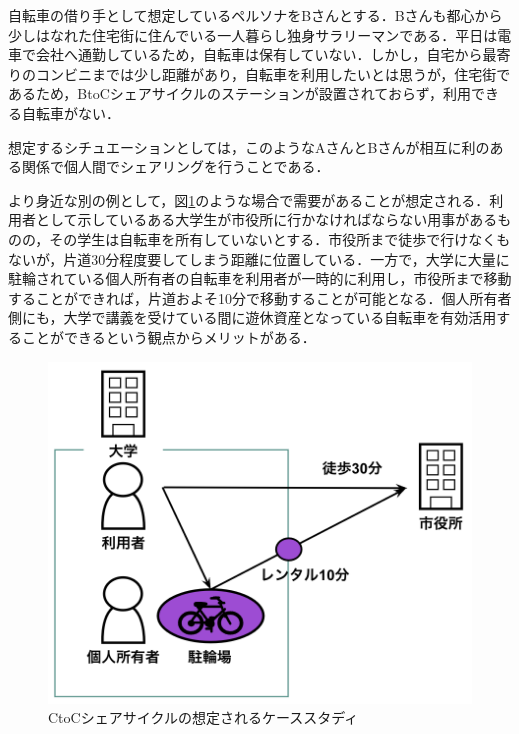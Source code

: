       \par 自転車の借り手として想定しているペルソナをBさんとする．Bさんも都心から少しはなれた住宅街に住んでいる一人暮らし独身サラリーマンである．平日は電車で会社へ通勤しているため，自転車は保有していない．しかし，自宅から最寄りのコンビニまでは少し距離があり，自転車を利用したいとは思うが，住宅街であるため，BtoCシェアサイクルのステーションが設置されておらず，利用できる自転車がない．
      \par 想定するシチュエーションとしては，このようなAさんとBさんが相互に利のある関係で個人間でシェアリングを行うことである．
      \par より身近な別の例として，図\ref{fig:CtoCシェアサイクルの想定されるケーススタディ}のような場合で需要があることが想定される．利用者として示しているある大学生が市役所に行かなければならない用事があるものの，その学生は自転車を所有していないとする．市役所まで徒歩で行けなくもないが，片道30分程度要してしまう距離に位置している．一方で，大学に大量に駐輪されている個人所有者の自転車を利用者が一時的に利用し，市役所まで移動することができれば，片道およそ10分で移動することが可能となる．個人所有者側にも，大学で講義を受けている間に遊休資産となっている自転車を有効活用することができるという観点からメリットがある．
      

      \begin{figure}[htbp]
        \centering
        \includegraphics[scale=0.52]
        {figures/casestudy.png}
        \caption{CtoCシェアサイクルの想定されるケーススタディ}
        \label{fig:CtoCシェアサイクルの想定されるケーススタディ}
      \end{figure}
  
